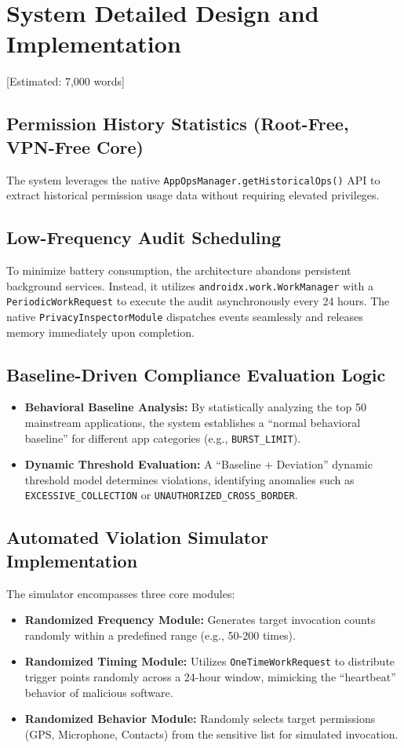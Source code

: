 \newpage
\section{System Detailed Design and Implementation} [Estimated: 7,000 words]

\subsection{Permission History Statistics (Root-Free, VPN-Free Core)}
The system leverages the native \texttt{AppOpsManager.getHistoricalOps()} API to extract historical permission usage data without requiring elevated privileges. 

\subsection{Low-Frequency Audit Scheduling}
To minimize battery consumption, the architecture abandons persistent background services. Instead, it utilizes \texttt{androidx.work.WorkManager} with a \texttt{PeriodicWorkRequest} to execute the audit asynchronously every 24 hours. The native \texttt{PrivacyInspectorModule} dispatches events seamlessly and releases memory immediately upon completion.

\subsection{Baseline-Driven Compliance Evaluation Logic}
\begin{itemize}
    \item \textbf{Behavioral Baseline Analysis:} By statistically analyzing the top 50 mainstream applications, the system establishes a ``normal behavioral baseline'' for different app categories (e.g., \texttt{BURST\_LIMIT}).
    \item \textbf{Dynamic Threshold Evaluation:} A ``Baseline + Deviation'' dynamic threshold model determines violations, identifying anomalies such as \texttt{EXCESSIVE\_COLLECTION} or \texttt{UNAUTHORIZED\_CROSS\_BORDER}.
\end{itemize}

\subsection{Automated Violation Simulator Implementation}
The simulator encompasses three core modules:
\begin{itemize}
    \item \textbf{Randomized Frequency Module:} Generates target invocation counts randomly within a predefined range (e.g., 50-200 times).
    \item \textbf{Randomized Timing Module:} Utilizes \texttt{OneTimeWorkRequest} to distribute trigger points randomly across a 24-hour window, mimicking the ``heartbeat'' behavior of malicious software.
    \item \textbf{Randomized Behavior Module:} Randomly selects target permissions (GPS, Microphone, Contacts) from the sensitive list for simulated invocation.
\end{itemize}